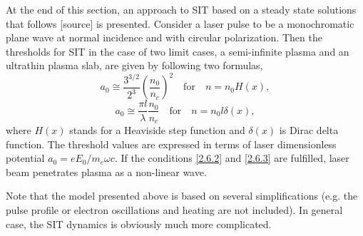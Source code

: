 At the end of this section, an approach to SIT based on a steady state solutions that follows [source] is presented. Consider a laser pulse to be a monochromatic plane wave at normal incidence and with circular polarization. Then the thresholds for SIT in the case of two limit cases, a semi-infinite plasma and an ultrathin plasma slab, are given by following two formulas,
\begin{equation}
\label{2.6.2}
a_0 \cong \frac{3^{3/2}}{2^3} \left( \frac{n_0}{n_c} \right)^2 \quad \mathrm{for} \quad n = n_0 H\left(x \right),
\end{equation}
\begin{equation}
\label{2.6.3}
a_0 \cong \frac{\pi l}{\lambda} \frac{n_0}{n_c} \quad \mathrm{for} \quad  n = n_0 l \delta\left(x \right),
\end{equation}
where $ H\left(x \right) $ stands for a Heaviside step function and $ \delta\left(x \right) $ is Dirac delta function. The threshold values are expressed in terms of laser dimensionless potential $ a_0 = e E_0/m_e \omega c $. If the conditions \ref{2.6.2} and \ref{2.6.3} are fulfilled, laser beam penetrates plasma as a non-linear wave.
 
Note that the model presented above is based on several simplifications (e.g. the pulse profile or electron oscillations and heating are not included). In general case, the SIT dynamics is obviously much more complicated.
